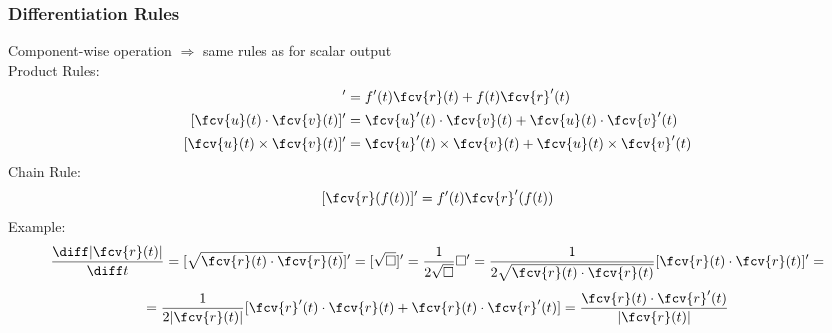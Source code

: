 \begin{frame}
\frametitle{Differentiation Rules}
Component-wise operation $\Longrightarrow$ same rules as for scalar output\\
  \pause Product Rules:
   \begin{align*}
   [f(t) \fcv{r}(t)]' & = f'(t) \fcv{r}(t) + f(t) \fcv{r}'(t) \\
   [\fcv{u}(t)\cdot \fcv{v}(t)]' & = \fcv{u}'(t)\cdot \fcv{v}(t) + \fcv{u}(t)
\cdot \fcv{v}'(t) \\
   [\fcv{u}(t)\times \fcv{v}(t)]' & = \fcv{u}'(t) \times \fcv{v}(t) +
\fcv{u}(t)\times \fcv{v}'(t)
 \end{align*}
  \pause Chain Rule:
  $$[\fcv{r}(f(t))]' = f'(t) \fcv{r}'(f(t))$$
    \pause Example:
    $$\frac{\diff |\fcv{r}(t)|}{\diff t} =
    [\sqrt{\fcv{r}(t)\cdot \fcv{r}(t)}]' = [\sqrt{\Box}]' =
    \frac{1}{2\sqrt{\Box}} \Box' =
    \frac{1}{2\sqrt{\fcv{r}(t)\cdot \fcv{r}(t)}}
    [\fcv{r}(t)\cdot \fcv{r}(t)]' = $$
    $$= \frac{1}{2|\fcv{r}(t)|}
    [\fcv{r}'(t)\cdot \fcv{r}(t) +
    \fcv{r}(t)\cdot \fcv{r}'(t)] = \frac{\fcv{r}(t)\cdot \fcv{r}'(t)}{|\fcv{r}(t)|}$$
\end{frame}